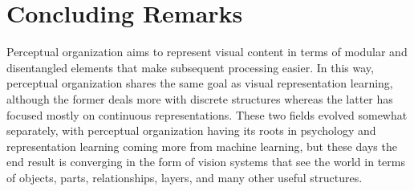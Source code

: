 \section{Concluding Remarks}
Perceptual organization aims to represent visual content in terms of modular and disentangled elements that make subsequent processing easier. In this way, perceptual organization shares the same goal as visual representation learning, although the former deals more with discrete structures whereas the latter has focused mostly on continuous representations. These two fields evolved somewhat separately, with perceptual organization having its roots in psychology and representation learning coming more from machine learning, but these days the end result is converging in the form of vision systems that see the world in terms of objects, parts, relationships, layers, and many other useful structures.








